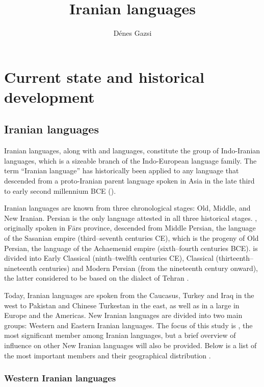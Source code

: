 \documentclass[output=paper]{langsci/langscibook}
\author{Dénes Gazsi}
\title{Iranian languages}
\begin{document}
\maketitle

\section{Current state and historical development}

\subsection{Iranian languages}

Iranian languages, along with  and  languages, constitute the group of Indo-Iranian languages, which is a sizeable branch of the Indo-European language family. The term ``Iranian language'' has historically been applied to any language that descended from a proto-Iranian parent language spoken in  Asia in the late third to early second millennium BCE (\citealt{Skjærvø2012}).

Iranian languages are known from three chronological stages: Old, Middle, and New Iranian. Persian is the only language attested in all three historical stages. , originally spoken in Fārs province, descended from Middle Persian, the language of the Sasanian empire (third–seventh centuries CE), which is the progeny of Old Persian, the language of the Achaemenid empire (sixth–fourth centuries BCE).  is divided into Early {Classical} (ninth–twelfth centuries CE), {Classical} (thirteenth–nineteenth centuries) and Modern Persian (from the nineteenth century onward), the latter considered to be based on the dialect of Tehran \citep[427]{Jeremiás2003}.

Today, Iranian languages are spoken from the Caucasus, Turkey and Iraq in the west to Pakistan and Chinese Turkestan in the east, as well as in a large  in Europe and the Americas. New Iranian languages are divided into two main groups: {Western} and {Eastern} Iranian languages. The focus of this study is , the most significant member among Iranian languages, but a brief overview of  influence on other New Iranian languages will also be provided. Below is a list of the most important members and their geographical distribution \citep[246]{Schmitt1989}.


\subsubsection{Western Iranian languages}
\end{document}
